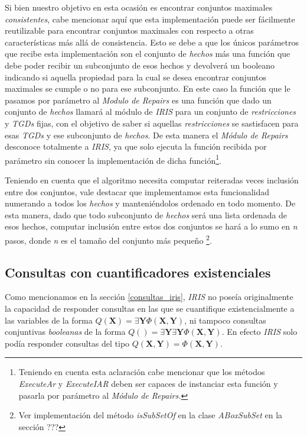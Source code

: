\documentclass[11pt,a4paper,twoside]{tesis}
\begin{document}
Si bien nuestro objetivo en esta ocasión es encontrar conjuntos maximales \textit{consistentes}, cabe mencionar aquí que esta implementación puede ser fácilmente reutilizable para encontrar conjuntos maximales con respecto a otras características más allá de consistencia. Esto se debe a que los únicos parámetros que recibe esta implementación son el conjunto de \textit{hechos} más una función que debe poder recibir un subconjunto de esos hechos y devolverá un booleano indicando si aquella propiedad para la cual se desea encontrar conjuntos maximales se cumple o no para ese subconjunto. En este caso la función que le pasamos por parámetro al \textit{Modulo de Repairs} es una función que dado un conjunto de \textit{hechos} llamará al módulo de \textit{IRIS} para un conjunto de \textit{restricciones} y \textit{TGDs} fijas, con el objetivo de saber si aquellas \textit{restricciones} se sastisfacen para esas \textit{TGDs} y ese subconjunto de \textit{hechos}. De esta manera el \textit{Módulo de Repairs} desconoce totalmente a \textit{IRIS}, ya que solo ejecuta la función recibida por parámetro sin conocer la implementación de dicha función\footnote{Teniendo en cuenta esta aclaración cabe mencionar que los métodos \textit{ExecuteAr} y \textit{ExecuteIAR} deben ser capaces de instanciar esta función y pasarla por parámetro al \textit{Módulo de Repairs.}}.

Teniendo en cuenta que el algoritmo necesita computar reiteradas veces inclusión entre dos conjuntos, vale destacar que implementamos esta funcionalidad numerando a todos los \textit{hechos} y manteniéndolos ordenado en todo momento. De esta manera, dado que todo subconjunto de \textit{hechos} será una lista ordenada de esos hechos, computar inclusión entre estos dos conjuntos se hará a lo sumo en \textit{n} pasos, donde \textit{n} es el tamaño del conjunto más pequeño \footnote{Ver implementación del método \textit{isSubSetOf} en la clase \textit{ABoxSubSet} en la sección ???}.

\subsection{Consultas con cuantificadores existenciales}

Como mencionamos en la sección \ref{consultas_iris}, \textit{IRIS} no poseía originalmente la capacidad de responder consultas en las que se cuantifique existencialmente a las variables de la forma $Q(\textbf{X}) = \exists\textbf{Y}\Phi(\textbf{X},\textbf{Y})$, ni tampoco consultas conjuntivas \textit{booleanas} de la forma $Q() = \exists\textbf{Y}\exists\textbf{Y}\Phi(\textbf{X},\textbf{Y})$. En efecto \textit{IRIS} solo podía responder consultas del tipo $Q(\textbf{X},\textbf{Y}) = \Phi(\textbf{X},\textbf{Y})$. 
\end{document}
